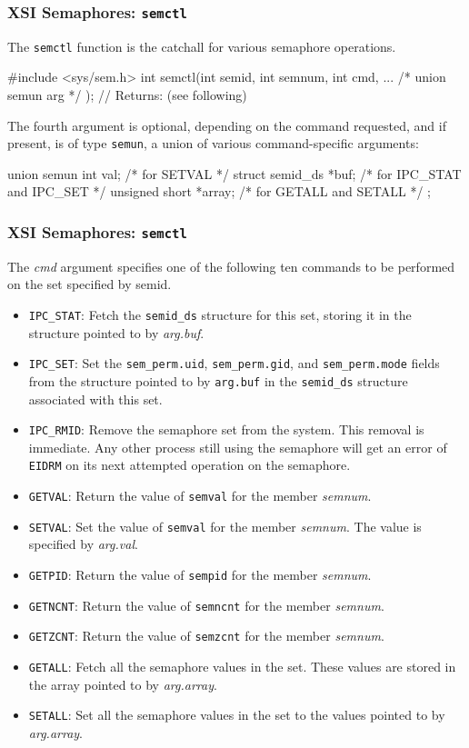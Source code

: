\documentclass[newPxFont,sthlmFooter,nooffset]{beamer}
\begin{document}
\begin{frame}[t, fragile]
  \frametitle{XSI Semaphores: \texttt{semctl}}
The \texttt{semctl} function is the catchall for various semaphore operations.
\begin{codedef}
#include <sys/sem.h>
int semctl(int semid, int semnum, int cmd, ... /* union semun arg */ );
// Returns: (see following)
\end{codedef}

The fourth argument is optional, depending on the command requested, and if present, is of type \texttt{semun}, a union of various command-specific arguments:

\begin{codedefnb}
union semun {
    int             val;           /* for SETVAL */
    struct          semid_ds *buf; /* for IPC_STAT and IPC_SET */
    unsigned short *array;         /* for GETALL and SETALL */ };
\end{codedefnb}

\end{frame}



\begin{frame}[t]
  \frametitle{XSI Semaphores: \texttt{semctl}}
The \textit{cmd} argument specifies one of the following ten commands to be performed on the set specified by semid.
{\scriptsize
\begin{itemize}
\item \texttt{IPC\_STAT}: Fetch the \texttt{semid\_ds} structure for this set, storing it in the structure pointed to by \textit{arg.buf}.
\item \texttt{IPC\_SET}: Set the \texttt{sem\_perm.uid}, \texttt{sem\_perm.gid}, and \texttt{sem\_perm.mode} fields from the structure pointed to by \texttt{arg.buf} in the \texttt{semid\_ds} structure associated with this set.
\item \texttt{IPC\_RMID}: Remove the semaphore set from the system. This removal is immediate. Any other process still using the semaphore will get an error of \texttt{EIDRM} on its next attempted operation on the semaphore.
\item \texttt{GETVAL}: Return the value of \texttt{semval} for the member \textit{semnum}.
\item \texttt{SETVAL}: Set the value of \texttt{semval} for the member \textit{semnum}. The value is specified by \textit{arg.val}.
\item \texttt{GETPID}: Return the value of \texttt{sempid} for the member \textit{semnum}.
\item \texttt{GETNCNT}: Return the value of \texttt{semncnt} for the member \textit{semnum}.
\item \texttt{GETZCNT}: Return the value of \texttt{semzcnt} for the member \textit{semnum}.
\item \texttt{GETALL}: Fetch all the semaphore values in the set. These values are stored in the array pointed to by \textit{arg.array}.
\item \texttt{SETALL}: Set all the semaphore values in the set to the values pointed to by \textit{arg.array}.
\end{itemize}
}
\end{frame}
\end{document}
